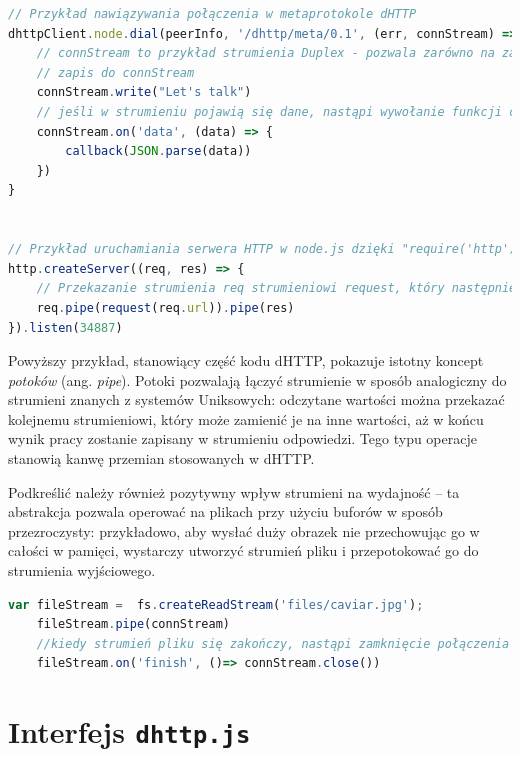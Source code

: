 \begin{lstlisting}[language=javascript]
// Przykład nawiązywania połączenia w metaprotokole dHTTP
dhttpClient.node.dial(peerInfo, '/dhttp/meta/0.1', (err, connStream) => {
    // connStream to przykład strumienia Duplex - pozwala zarówno na zapis, jak i odczyt.
    // zapis do connStream
    connStream.write("Let's talk")
    // jeśli w strumieniu pojawią się dane, nastąpi wywołanie funkcji callback. Warto zauważyć, że to wywołanie może nastąpić zarówno przed, jak i po zawołaniu write -- zależy od stanu strumienia, który może otrzymywać dane w innych miejscach programu
    connStream.on('data', (data) => {
        callback(JSON.parse(data))
    })
}


// Przykład uruchamiania serwera HTTP w node.js dzięki "require('http')"
http.createServer((req, res) => {
    // Przekazanie strumienia req strumieniowi request, który następnie zostanie przekazany do res. W efekcie zadziałamy jako najprostsze proxy - otrzymamy dane o oryginalnym zapytaniu, wywołamy je z punktu widzenia serwera, i przekażemy wynik w ramach odpowiedzi.
    req.pipe(request(req.url)).pipe(res)
}).listen(34887)
\end{lstlisting}

Powyższy przykład, stanowiący część kodu dHTTP, pokazuje istotny koncept {\em potoków} (ang. {\em pipe}). Potoki pozwalają łączyć strumienie w sposób analogiczny do strumieni znanych z systemów Uniksowych: odczytane wartości można przekazać kolejnemu strumieniowi, który może zamienić je na inne wartości, aż w końcu wynik pracy zostanie zapisany w strumieniu odpowiedzi. Tego typu operacje stanowią kanwę przemian stosowanych w dHTTP.

Podkreślić należy również pozytywny wpływ strumieni na wydajność -- ta abstrakcja pozwala operować na plikach przy użyciu buforów w sposób przezroczysty: przykładowo, aby wysłać duży obrazek nie przechowując go w całości w pamięci, wystarczy utworzyć strumień pliku i przepotokować go do strumienia wyjściowego.

\begin{lstlisting}[language=javascript]
    var fileStream =  fs.createReadStream('files/caviar.jpg');
    fileStream.pipe(connStream)
    //kiedy strumień pliku się zakończy, nastąpi zamknięcie połączenia aby poinformować odbiorcę, że nic już na niego nie czeka
    fileStream.on('finish', ()=> connStream.close())
\end{lstlisting}

\section{Interfejs \texttt{dhttp.js}}

